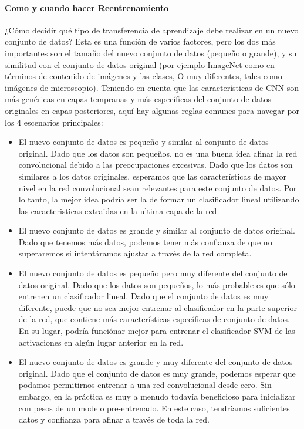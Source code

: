 \documentclass[a4paper,11pt,spanish]{book}
\begin{document}
      \paragraph{Como y cuando hacer Reentrenamiento}
	¿Cómo decidir qué tipo de transferencia de aprendizaje debe realizar en un nuevo conjunto de datos? Esta es una función de varios factores, pero los dos más importantes son el
	tamaño del nuevo conjunto de datos (pequeño o grande), y su similitud con el conjunto de datos original (por ejemplo ImageNet-como en términos de contenido de imágenes y las clases,
	O muy diferentes, tales como imágenes de microscopio). Teniendo en cuenta que las características de CNN son más genéricas en capas tempranas y más específicas del conjunto de datos
	originales en capas posteriores, aquí hay algunas reglas comunes para navegar por los 4 escenarios principales:
	\begin{itemize}
	  \item El nuevo conjunto de datos es pequeño y similar al conjunto de datos original. Dado que los datos son pequeños, no es una buena idea afinar la red convolucional debido a las
	  preocupaciones excesivas. Dado que los datos son similares a los datos originales, esperamos que las características de mayor nivel en la red convolucional sean relevantes para este
	  conjunto de datos. Por lo tanto, la mejor idea podría ser la de formar un clasificador lineal utilizando las caracteristicas extraidas en la ultima capa de la red.
	  \item El nuevo conjunto de datos es grande y similar al conjunto de datos original. Dado que tenemos más datos, podemos tener más confianza de que no superaremos si intentáramos
	  ajustar a través de la red completa.
	  \item El nuevo conjunto de datos es pequeño pero muy diferente del conjunto de datos original. Dado que los datos son pequeños, lo más probable es que sólo entrenen un clasificador
	  lineal. Dado que el conjunto de datos es muy diferente, puede que no sea mejor entrenar al clasificador en la parte superior de la red, que contiene más características específicas
	  de conjunto de datos. En su lugar, podría funciónar mejor para entrenar el clasificador SVM de las activaciones en algún lugar anterior en la red.
	  \item El nuevo conjunto de datos es grande y muy diferente del conjunto de datos original. Dado que el conjunto de datos es muy grande, podemos esperar que podamos permitirnos
	  entrenar a una red convolucional desde cero. Sin embargo, en la práctica es muy a menudo todavía beneficioso para inicializar con pesos de un modelo pre-entrenado.
	  En este caso, tendríamos suficientes datos y confianza para afinar a través de toda la red.
	\end{itemize}
\end{document}
